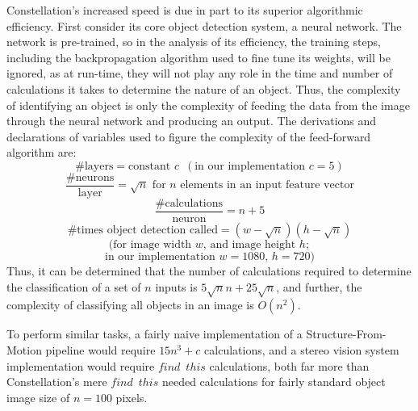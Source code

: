 Constellation's increased speed is due in part to its superior algorithmic efficiency. First consider its core object detection system, a neural network. The network is pre-trained, so in the analysis of its efficiency, the training steps, including the backpropagation algorithm used to fine tune its weights, will be ignored, as at run-time, they will not play any role in the time and number of calculations it takes to determine the nature of an object. Thus, the complexity of identifying an object is only the complexity of feeding the data from the image through the neural network and producing an output. The derivations and declarations of variables used to figure the complexity of the feed-forward algorithm are:
$$\text{\# layers}=\text{constant }c \enspace (\text{in our implementation }c=5)$$
$$\frac{\text{\# neurons}}{\text{layer}}=\sqrt{n}\text{ for $n$ elements in an input feature vector}$$
$$\frac{\text{\# calculations}}{\text{neuron}}=n+5$$
$$\text{\# times object detection called}=(w-\sqrt{n})(h-\sqrt{n})$$
$$\text{(for image width }w\text{, and image height }h;$$
$$\text{in our implementation }w=1080\text{, }h=720)$$
Thus, it can be determined that the number of calculations required to determine the classification of a set of $n$ inputs is $5\sqrt{n}n+25\sqrt{n}$, and further, the complexity of classifying all objects in an image is $O(n^2)$. 

To perform similar tasks, a fairly naive implementation of a Structure-From-Motion pipeline would require $15n^3+c$ calculations, and a stereo vision system implementation would require $find\enspace this$ calculations, both far more than Constellation's mere $find\enspace this$ needed calculations for fairly standard object image size of $n=100$ pixels.